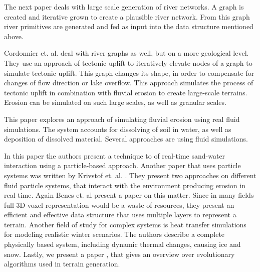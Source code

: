 The next paper \cite{Genevaux:2013:TGU:2461912.2461996} deals with large scale generation of river networks. A graph is created and iterative grown to create a plausible river network. From this graph river primitives are generated and fed as input into the data structure mentioned above. 

Cordonnier et. al. \cite{cordonnier2016large}  deal with river graphs as well, but on a more geological level. They use an approach of tectonic uplift to iteratively elevate nodes of a graph to simulate tectonic uplift. This graph changes its shape, in order to compensate for changes of flow direction or lake overflow. This approach simulates the process of tectonic uplift in combination with fluvial erosion to create large-scale terrains. Erosion can be simulated on such large scales, as well as granular scales. 

This paper \cite{Neidhold:2005:IPB:2381356.2381361} explores an approach of simulating fluvial erosion using real fluid simulations. The system accounts for dissolving of soil in water, as well as deposition of dissolved material. Several approaches are using fluid simulations. 

In this paper \cite{rungjiratananon2008real}the authors present a technique to of real-time sand-water interaction using a particle-based approach. Another paper that uses particle systems was written by Krivstof et. al. \cite{krivstof2009hydraulic}. They present two approaches on different fluid particle systems, that interact with the environment producing erosion in real time. 
Again Benes et. al \cite{benes2001layered} present a paper on this matter. Since in many fields full 3D voxel representation would be a waste of resources, they present an efficient and effective data structure that uses multiple layers to represent a terrain. 
Another field of study for complex systems is heat transfer simulations for modeling realistic winter scenarios\cite{marechal2010heat}. The authors describe a complete physically based system, including dynamic thermal changes, causing ice and snow. 
Lastly, we present a paper \cite{raffe2012survey}, that gives an overview over evolutionary algorithms used in terrain generation. 


